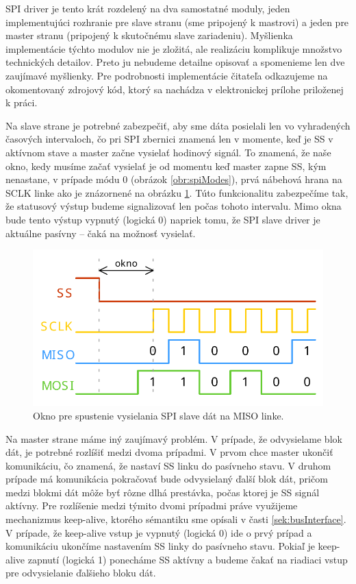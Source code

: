 SPI driver je tento krát rozdelený na dva samostatné moduly, jeden implementujúci rozhranie pre slave stranu (sme pripojený k mastrovi) a jeden pre master stranu (pripojený k skutočnému slave zariadeniu). Myšlienka implementácie týchto modulov nie je zložitá, ale realizáciu komplikuje množstvo technických detailov. Preto ju nebudeme detailne opisovať a spomenieme len dve zaujímavé myšlienky. Pre podrobnosti implementácie čitateľa odkazujeme na okomentovaný zdrojový kód, ktorý sa nachádza v elektronickej prílohe priloženej k práci.

Na slave strane je potrebné zabezpečiť, aby sme dáta posielali len vo vyhradených časových intervaloch, čo pri SPI zbernici znamená len v momente, keď je SS v aktívnom stave a master začne vysielať hodinový signál. To znamená, že naše okno, kedy musíme začať vysielať je od momentu keď master zapne SS, kým nenastane, v prípade módu 0 (obrázok \ref{obr:spiModes}), prvá  nábehová hrana na SCLK linke ako je znázornené na obrázku \ref{obr:spiSlaveWindow}. Túto funkcionalitu zabezpečíme tak, že statusový výstup  budeme signalizovať len počas tohoto intervalu. Mimo okna bude tento výstup vypnutý (logická 0) napriek tomu, že SPI slave driver je aktuálne pasívny -- čaká na možnosť vysielať.

\begin{figure}
    \centerline{\includegraphics[width=1\textwidth]{images/signals/spiSlaveWindow.pdf}}
    \caption[Okno pre spustenie vysielania SPI slave dát]{Okno pre spustenie vysielania SPI slave dát na MISO linke.}
    \label{obr:spiSlaveWindow}
\end{figure}

Na master strane máme iný zaujímavý problém. V prípade, že odvysielame blok dát, je potrebné rozlíšiť medzi dvoma prípadmi. V prvom chce master ukončiť komunikáciu, čo znamená, že nastaví SS linku do pasívneho stavu. V druhom prípade má komunikácia pokračovať bude odvysielaný ďalší blok dát, pričom medzi blokmi dát môže byť rôzne dlhá prestávka, počas ktorej je SS signál aktívny. Pre rozlíšenie medzi týmito dvomi prípadmi práve využijeme mechanizmus keep-alive, ktorého sémantiku sme opísali v časti \ref{sek:busInterface}. V prípade, že keep-alive vstup je vypnutý (logická 0) ide o prvý prípad a komunikáciu ukončíme nastavením SS linky do pasívneho stavu. Pokiaľ je  keep-alive zapnutí (logická 1) ponecháme SS aktívny a budeme čakať na riadiaci vstup pre odvysielanie ďalšieho bloku dát.

